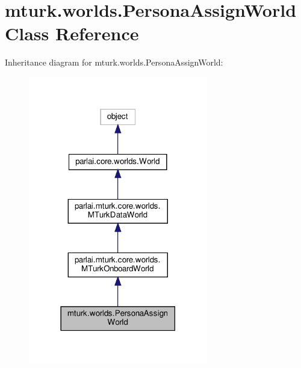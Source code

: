 \hypertarget{classmturk_1_1worlds_1_1PersonaAssignWorld}{}\section{mturk.\+worlds.\+Persona\+Assign\+World Class Reference}
\label{classmturk_1_1worlds_1_1PersonaAssignWorld}


Inheritance diagram for mturk.\+worlds.\+Persona\+Assign\+World\+:
\nopagebreak
\begin{figure}[H]
\begin{center}
\leavevmode
\includegraphics[width=222pt]{classmturk_1_1worlds_1_1PersonaAssignWorld__inherit__graph}
\end{center}
\end{figure}


